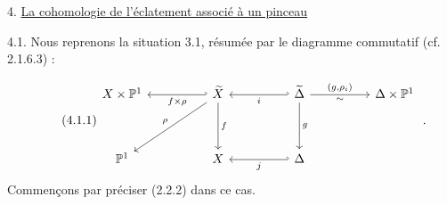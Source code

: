 4. \underline{La cohomologie de l'éclatement associé à un pinceau}

4.1. Nous reprenons la situation 3.1, résumée par le diagramme commutatif (cf. 2.1.6.3) :

\begin{equation}\tag{4.1.1}
\begin{tikzcd}[row sep=huge, column sep=huge]
X \times \mathbb{P}^{1} & \widetilde{X} \arrow[l, hook', "f \times \rho"] \arrow[d, "f"] \arrow[dl, "\rho"'] & \widetilde{\Delta} \arrow[l, hook', "i"] \arrow[d, "g"] \arrow[r, "{(g,\rho_{i})}", "\sim"'] & \Delta \times \mathbb{P}^{1} \\
\mathbb{P}^{1} & X & \Delta \arrow[l, hook', "j"]
\end{tikzcd}\;.
\end{equation}
Commençons par préciser (2.2.2) dans ce cas.

